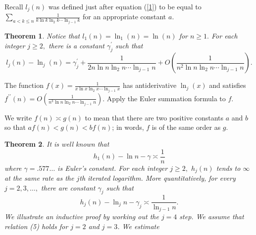 \documentclass{article}
\newtheorem{theorem}{Theorem}
\newenvironment{proof}[1][Proof]{}{}
\begin{document}
Recall $l_{j}\left( n\right) $ was defined just after equation (\ref{1}) to
be equal to $\sum_{a<k\leq n}\frac{1}{k\ln k\ln _{2}k\cdots \ln _{j-1}k}$
for an appropriate constant $a$.

\begin{theorem}
\label{Th1}Notice that $l_{1}\left( n\right) =\ln _{1}\left( n\right) =\ln
\left( n\right) $ for $n\geq 1.$ For each integer $j\geq 2,$ there is a
constant $\gamma _{j}^{\prime }$ such that%
\begin{equation}
l_{j}(n)-\ln _{j}\left( n\right) =\gamma _{j}^{\prime }+\frac{1}{2n\ln n\ln
_{2}n\cdots \ln _{j-1}n}+O\left( \frac{1}{n^{2}\ln n\ln _{2}n\cdots \ln
_{j-1}n}\right) .  
\end{equation}
\end{theorem}

\begin{proof}
The function $f\left( x\right) =\frac{1}{x\ln x\ln _{2}x\cdots \ln _{j-1}x}$
has antiderivative $\ln _{j}\left( x\right) $ and satisfies $f^{\prime
\prime }\left( n\right) =O\left( \frac{1}{n^{3}\ln n\ln _{2}n\cdots \ln
_{j-1}n}\right) $. Apply the Euler summation formula to $f$.
\end{proof}

We write $f\left( n\right) \asymp g\left( n\right) $ to mean that there are
two positive constants $a$ and $b$ so that $af\left( n\right) <g\left(
n\right) <bf\left( n\right) $; in words, $f$ is of the same order as $g.$ 
\cite[page 7]{HW}

\begin{theorem}
\label{Th2}It is well known that 
\begin{equation}
h_{1}\left( n\right) -\ln n-\gamma \asymp \frac{1}{n}  \label{6}
\end{equation}%
where $\gamma =.577\dots $ is Euler's constant. For each integer $j\geq 2,$ $%
h_{j}\left( n\right) $ tends to $\infty $ at the same rate as the $j$th
iterated logarithm. More quantitatively, for every $j=2,3,\dots ,$ there are
constant $\gamma _{j}$ such that%
\begin{equation}
h_{j}\left( n\right) -\ln _{j}n-\gamma _{j}\asymp \frac{1}{\ln _{j-1}n}.
\label{5}
\end{equation}%
We illustrate an inductive proof by working out the $j=4$ step. We assume
that relation (5) holds for $j=2$ and $j=3$. We estimate
\end{theorem}
\end{document}
